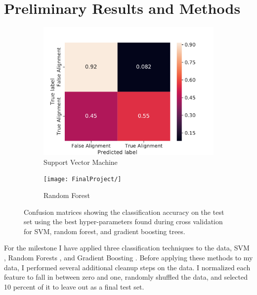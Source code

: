 \documentclass{article}
\begin{document}
\section*{Preliminary Results and Methods}

\begin{figure}
\centering
\begin{subfigure}{.5\textwidth}
  \centering
  \includegraphics[width=\linewidth]{FinalProject/conf_SVM.pdf}
  \caption{Support Vector Machine}
  \label{fig:sub1}
\end{subfigure}%
\begin{subfigure}{.5\textwidth}
  \centering
  \texttt{[image: FinalProject/]}
  \caption{Random Forest}
  \label{fig:sub2}
\end{subfigure}
\caption{Confusion matrices showing the classification accuracy on the test set using the best hyper-parameters found during cross validation for SVM, random forest, and gradient boosting trees. }
\label{fig:conf}
\end{figure}


For the milestone I have applied three classification techniques to the data, SVM \parencite{Hastie2008}, Random Forests \parencite{Ho1995, Breiman2001}, and Gradient Boosting \parencite{Friedman1999GreedyMachine}. \parencite{Pedregosa2011Scikit-learnPython} Before applying these methods to my data, I performed several additional cleanup steps on the data. I normalized each feature to fall in between zero and one, randomly shuffled the data, and selected 10 percent of it to leave out as a final test set. 
\end{document}
